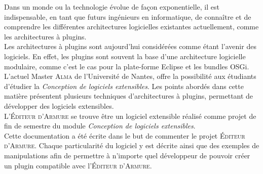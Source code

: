 

Dans un monde ou la technologie évolue de façon exponentielle, il est indispensable, en tant que futurs ingénieurs en informatique, de connaître et de comprendre les différentes architectures logicielles existantes actuellement, comme les architectures à plugins.\\

Les architectures à plugins sont aujourd'hui considérées comme étant l'avenir des logiciels. En effet, les plugins sont souvent la base d’une architecture logicielle modulaire, comme c’est le cas pour la plate-forme Eclipse et les bundles OSGi.\\

L'actuel Master \textsc{Alma} de l’Université de Nantes, offre la possibilité aux étudiants d'étudier la \textit{Conception de logiciels extensibles}. Les points abordés dans cette matière présentent plusieurs techniques d'architectures à plugins, permettant de développer des logiciels extensibles. \\

L'\textsc{\'Editeur d'Armure} se trouve être un logiciel extensible réalisé comme projet de fin de semestre du module \textit{Conception de logiciels extensibles}.\\

Cette documentation a été écrite dans le but de commenter le projet \textsc{\'Editeur d'Armure}. Chaque particularité du logiciel y est décrite ainsi que des exemples de manipulations afin de permettre à n’importe quel développeur de pouvoir créer un plugin compatible avec l'\textsc{\'Editeur d'Armure}.
